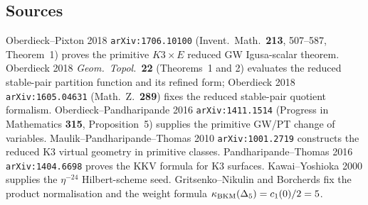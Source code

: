 \subsection*{Sources}

Oberdieck--Pixton 2018 \texttt{arXiv:1706.10100} (Invent.\ Math.\
\textbf{213}, 507--587, Theorem~1) proves the primitive
\(K3\times E\) reduced GW Igusa-scalar theorem.  Oberdieck 2018
\emph{Geom.\ Topol.}\ \textbf{22} (Theorems~1 and 2) evaluates the
reduced stable-pair partition function and its refined form; Oberdieck
2018 \texttt{arXiv:1605.04631} (Math.\ Z.\ \textbf{289}) fixes the
reduced stable-pair quotient formalism.  Oberdieck--Pandharipande 2016
\texttt{arXiv:1411.1514} (Progress in Mathematics \textbf{315},
Proposition~5) supplies the primitive GW/PT change of variables.
Maulik--Pandharipande--Thomas 2010 \texttt{arXiv:1001.2719} constructs
the reduced K3 virtual geometry in primitive classes.
Pandharipande--Thomas 2016 \texttt{arXiv:1404.6698} proves the KKV
formula for K3 surfaces.  Kawai--Yoshioka 2000 supplies the
\(\eta^{-24}\) Hilbert-scheme seed.  Gritsenko--Nikulin and
Borcherds fix the product normalisation and the weight formula
\(\kappa_{\mathrm{BKM}}(\Delta_5)=c_1(0)/2=5\).
